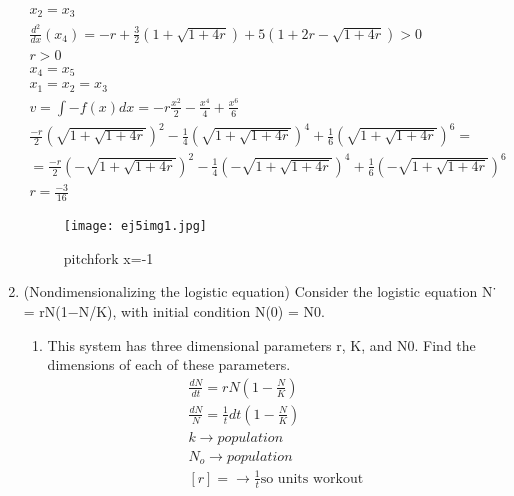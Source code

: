 \documentclass[a4paper,10pt]{article}
\begin{document}
\begin{enumerate}
\begin{equation}
\begin{aligned}
                     x_{2}=x_{3}\\
                     \frac{d^{2}}{dx}(x_4)=-r +\frac{3}{2}(1+\sqrt{1+4r}) + 5( 1 + 2r - \sqrt{1+4r})>0 \\
                     r>0\\
                     x_{4}=x_{5}\\
                     x_{1}=x_{2}=x_{3}\\
                     v=\int -f(x)dx= -r\frac{x^{2}}{2} - \frac{x^{4}}{4} + \frac{x^{6}}{6}\\
                     \frac{-r}{2}(\sqrt{1+ \sqrt{1+4r}})^{2} - \frac{1}{4}(\sqrt{1+\sqrt{1+4r}})^{4} + \frac{1}{6}(\sqrt{1+\sqrt{1+4r}})^{6}=\\
                     = \frac{-r}{2}(-\sqrt{1+ \sqrt{1+4r}})^{2} - \frac{1}{4}(-\sqrt{1+\sqrt{1+4r}})^{4} +\frac{1}{6}(-\sqrt{1+\sqrt{1+4r}})^{6}\\
                     r= \frac{-3}{16}
                \end{aligned}
            \end{equation}
            \newpage
            \begin{figure}[h]
                \centering
                \texttt{[image: ej5img1.jpg]}
                \caption{pitchfork x=-1}
                \label{fig:mesh1}
            \end{figure}
    \newpage         
    \item (Nondimensionalizing the logistic equation) Consider the logistic equation N˙ = rN(1−N/K), with initial condition N(0) = N0. 
        \begin{enumerate}
            \item This system has three dimensional parameters r, K, and N0. Find the dimensions of each of these parameters.
                \begin{equation}
                    \begin{aligned}
                        \frac{dN}{dt}= rN(1-\frac{N}{K})\\
                        \frac{dN}{N}=\frac{1}{t}dt(1-\frac{N}{K})\\
                        k\longrightarrow population\\
                        N_{o}\longrightarrow population\\
                        [r]= \longrightarrow\frac{1}{t} \text{so units workout}


\end{aligned}
\end{equation}
\end{enumerate}
\end{enumerate}
\end{document}

